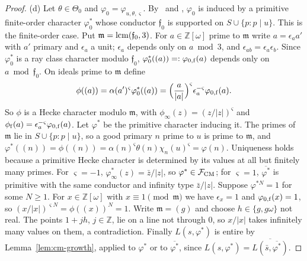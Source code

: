 \documentclass[11pt]{article}
\numberwithin{equation}{section}
\newcommand{\OO}{\mathbb Z[\omega]}
\begin{document}
\begin{proof}
(d) Let $\theta\in\Theta_0$ and $\varphi_0=\varphi_{u,\theta,\varsigma}$. By~\cite[Section~8.1]{OAI78} and
\cite[Lemma~4.1]{OAI78}, $\varphi_0$ is induced by a primitive finite-order
character $\varphi_0^*$ whose conductor $\mathfrak f_0$ is supported on $S\cup\{p:p\mid u\}$. This is
the finite-order case. Put $\mathfrak m={\rm lcm}(\mathfrak f_0,3)$. For $a\in\OO$ prime to
$\mathfrak m$ write $a=\epsilon_aa'$ with $a'$ primary and $\epsilon_a$ a unit; $\epsilon_a$ depends only
on $a\bmod3$, and $\epsilon_{ab}=\epsilon_a\epsilon_b$. Since $\varphi_0^*$ is a ray class character
modulo $\mathfrak f_0$, $\varphi_0^*((a))=:\varphi_{0,\rm f}(a)$ depends only on $a\bmod\mathfrak f_0$.
On ideals prime to $\mathfrak m$ define
\begin{equation}\label{eq:d167}
 \phi((a))=\alpha(a')^{\varsigma}\varphi_0^*((a))
 =\Bigl(\frac{a}{|a|}\Bigr)^{\varsigma}\epsilon_a^{-\varsigma}\varphi_{0,\rm f}(a).
\end{equation}
So $\phi$ is a Hecke character modulo $\mathfrak m$, with $\phi_\infty(z)=(z/|z|)^\varsigma$ and
$\phi_{\rm f}(a)=\epsilon_a^{-\varsigma}\varphi_{0,\rm f}(a)$. Let $\varphi^*$ be the primitive character
inducing it. The primes of $\mathfrak m$ lie in $S\cup\{p:p\mid u\}$, so a good primary $n$ prime to
$u$ is prime to $\mathfrak m$, and $\varphi^*((n))=\phi((n))=\alpha(n)^\varsigma\theta(n)\chi_n(u)^\varsigma=\varphi(n)$.
Uniqueness holds because a primitive Hecke character is determined by its values at all but finitely
many primes. For $\varsigma=-1$, $\varphi^*_\infty(z)=\bar z/|z|$, so $\varphi^*\in\mathcal F_{\rm CM}$; for
$\varsigma=1$, $\overline{\varphi^*}$ is primitive with the same conductor and infinity type
$\bar z/|z|$. Suppose $\varphi^{*N}=1$ for some $N\ge1$. For $x\in\OO$ with $x\equiv1\pmod{\mathfrak m}$
we have $\epsilon_x=1$ and $\varphi_{0,\rm f}(x)=1$, so $(x/|x|)^{\varsigma N}=\phi((x))^N=1$. Write
$\mathfrak m=(g)$ and choose $h\in\{g,g\omega\}$ not real. The points $1+jh$, $j\in\mathbb Z$, lie on a
line not through $0$, so $x/|x|$ takes infinitely many values on them, a contradiction. Finally
$L(s,\varphi^*)$ is entire by Lemma~\ref{lem:cm-growth}, applied to $\varphi^*$ or to
$\overline{\varphi^*}$, since $L(s,\varphi^*)=\overline{L(\bar s,\overline{\varphi^*})}$.


\end{proof}
\end{document}
